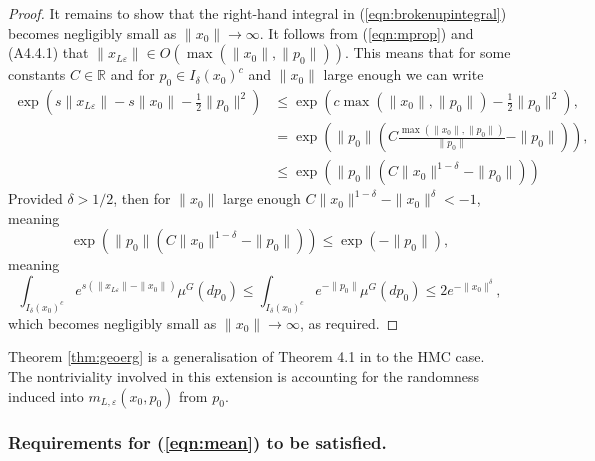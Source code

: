 \documentclass[bj,numbers,noshowframe]{imsart}
\newcommand{\R}{\mathbb{R}}
\newcommand{\e}{\varepsilon}
\theoremstyle{definition}
\theoremstyle{plain}
\theoremstyle{definition}
\begin{document}
\begin{proof}
It remains to show that the right-hand integral in (\ref{eqn:brokenupintegral}) becomes negligibly small as $\|x_0\| \to \infty$.  It follows from (\ref{eqn:mprop}) and (A4.4.1) that $\|x_{L\e}\| \in O(\max(\|x_0\|,\|p_0\|))$.  This means that for some constants $C \in \R$ and for $p_0 \in I_\delta(x_0)^c$ and $\|x_0\|$ large enough we can write
\begin{align*}
\exp\left( s\|x_{L\e}\| - s\|x_0\| - \frac{1}{2}\|p_0\|^2  \right) &\leq \exp\left( c\max(\|x_0\|,\|p_0\|) - \frac{1}{2}\|p_0\|^2 \right), \\
&= \exp\left( \|p_0\|\left( C\frac{\max(\|x_0\|,\|p_0\|)}{\|p_0\|} - \|p_0\|\right) \right), \\
&\leq \exp\left( \|p_0\|\left( C\|x_0\|^{1 - \delta} - \|p_0\|\right) \right)
\end{align*}
Provided $\delta > 1/2$, then for $\|x_0\|$ large enough $C\|x_0\|^{1-\delta} - \|x_0\|^\delta < -1$, meaning
\[
\exp\left( \|p_0\|\left( C\|x_0\|^{1 - \delta} - \|p_0\|\right) \right) \leq \exp\left(-\|p_0\|\right),
\]
meaning
\[
\int_{I_\delta(x_0)^c} e^{s(\|x_{L\e}\| - \|x_0\|)}\mu^G(dp_0) \leq \int_{I_\delta(x_0)^c} e^{-\|p_0\|} \mu^G(dp_0) \leq 2e^{-\|x_0\|^\delta},
\]
which becomes negligibly small as $\|x_0\| \to \infty$, as required.
\end{proof}

Theorem \ref{thm:geoerg} is a generalisation of Theorem 4.1 in \citep{roberts1996exponential} to the HMC case.  The nontriviality involved in this extension is accounting for the randomness induced into $m_{L,\e}(x_0,p_0)$ from $p_0$.

\subsubsection{Requirements for (\ref{eqn:mean}) to be satisfied.}
\end{document}
